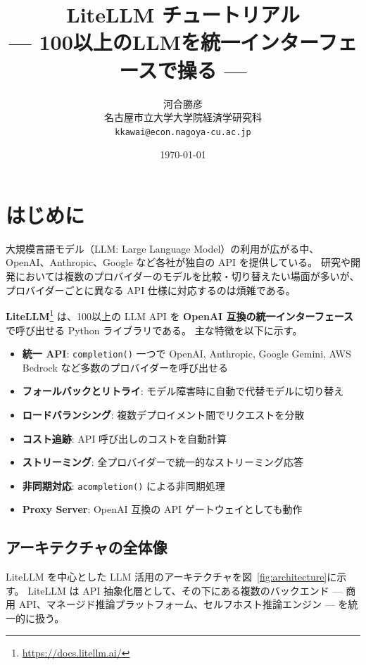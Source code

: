 \documentclass[a4paper,11pt]{ltjsarticle}
\title{%
  {\LARGE LiteLLM チュートリアル} \\[6pt]
  {\large --- 100以上のLLMを統一インターフェースで操る ---}
}
\author{
  河合勝彦 \\
  名古屋市立大学大学院経済学研究科 \\
  \texttt{kkawai@econ.nagoya-cu.ac.jp}
}
\date{\today}
\newcommand{\code}[1]{\texttt{#1}}
\begin{document}
\maketitle
\tableofcontents
\clearpage

\section{はじめに}
\label{sec:introduction}

大規模言語モデル（LLM: Large Language Model）の利用が広がる中、OpenAI、Anthropic、Google など各社が独自の API を提供している。
研究や開発においては複数のプロバイダーのモデルを比較・切り替えたい場面が多いが、プロバイダーごとに異なる API 仕様に対応するのは煩雑である。

\textbf{LiteLLM}\footnote{\url{https://docs.litellm.ai/}} は、100以上の LLM API を \textbf{OpenAI 互換の統一インターフェース}で呼び出せる Python ライブラリである。
主な特徴を以下に示す。

\begin{itemize}
  \item \textbf{統一 API}: \code{completion()} 一つで OpenAI, Anthropic, Google Gemini, AWS Bedrock など多数のプロバイダーを呼び出せる
  \item \textbf{フォールバックとリトライ}: モデル障害時に自動で代替モデルに切り替え
  \item \textbf{ロードバランシング}: 複数デプロイメント間でリクエストを分散
  \item \textbf{コスト追跡}: API 呼び出しのコストを自動計算
  \item \textbf{ストリーミング}: 全プロバイダーで統一的なストリーミング応答
  \item \textbf{非同期対応}: \code{acompletion()} による非同期処理
  \item \textbf{Proxy Server}: OpenAI 互換の API ゲートウェイとしても動作
\end{itemize}

\subsection{アーキテクチャの全体像}

LiteLLM を中心とした LLM 活用のアーキテクチャを図~\ref{fig:architecture}に示す。
LiteLLM は API 抽象化層として、その下にある複数のバックエンド --- 商用 API、マネージド推論プラットフォーム、セルフホスト推論エンジン --- を統一的に扱う。
\end{document}
